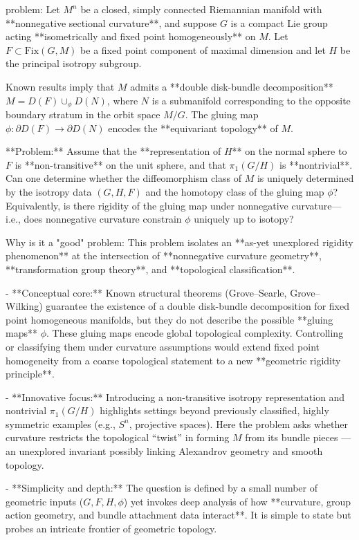 problem:  
Let \(M^n\) be a closed, simply connected Riemannian manifold with **nonnegative sectional curvature**, and suppose \(G\) is a compact Lie group acting **isometrically and fixed point homogeneously** on \(M\). Let \(F \subset \mathrm{Fix}(G, M)\) be a fixed point component of maximal dimension and let \(H\) be the principal isotropy subgroup.  

Known results imply that \(M\) admits a **double disk-bundle decomposition** \(M = D(F) \cup_\phi D(N)\), where \(N\) is a submanifold corresponding to the opposite boundary stratum in the orbit space \(M/G\). The gluing map \(\phi\colon \partial D(F)\to \partial D(N)\) encodes the **equivariant topology** of \(M\).  

**Problem:**  
Assume that the **representation of \(H\)** on the normal sphere to \(F\) is **non-transitive** on the unit sphere, and that \(\pi_1(G/H)\) is **nontrivial**.  
Can one determine whether the diffeomorphism class of \(M\) is uniquely determined by the isotropy data \((G,H,F)\) and the homotopy class of the gluing map \(\phi\)?  
Equivalently, is there rigidity of the gluing map under nonnegative curvature—i.e., does nonnegative curvature constrain \(\phi\) uniquely up to isotopy?  

Why is it a "good" problem:  
This problem isolates an **as-yet unexplored rigidity phenomenon** at the intersection of **nonnegative curvature geometry**, **transformation group theory**, and **topological classification**.  

- **Conceptual core:** Known structural theorems (Grove–Searle, Grove–Wilking) guarantee the existence of a double disk-bundle decomposition for fixed point homogeneous manifolds, but they do not describe the possible **gluing maps** \(\phi\). These gluing maps encode global topological complexity. Controlling or classifying them under curvature assumptions would extend fixed point homogeneity from a coarse topological statement to a new **geometric rigidity principle**.  

- **Innovative focus:** Introducing a non-transitive isotropy representation and nontrivial \(\pi_1(G/H)\) highlights settings beyond previously classified, highly symmetric examples (e.g., \(S^n\), projective spaces). Here the problem asks whether curvature restricts the topological “twist” in forming \(M\) from its bundle pieces — an unexplored invariant possibly linking Alexandrov geometry and smooth topology.  

- **Simplicity and depth:** The question is defined by a small number of geometric inputs (\(G, F, H, \phi\)) yet invokes deep analysis of how **curvature, group action geometry, and bundle attachment data interact**. It is simple to state but probes an intricate frontier of geometric topology.  

